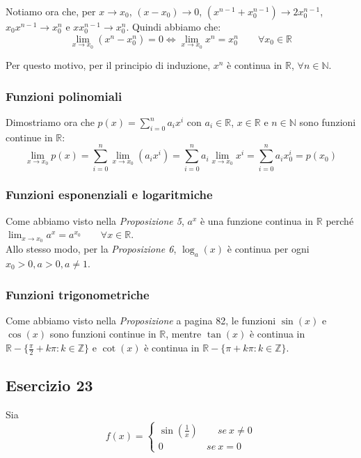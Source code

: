 \documentclass{article}
\begin{document}
\noindent Notiamo ora che, per $x \to x_0$, $(x - x_0) \to 0$, $(x^{n - 1} + x_0^{n - 1}) \to 2x_0^{n - 1}$, $x_0x^{n - 1} \to x_0^n$ e $xx_0^{n - 1} \to x_0^n$. Quindi abbiamo che: 
\begin{equation*}
    \lim_{x \to x_0} (x^n - x_0^n) = 0 \iff \lim_{x \to x_0} x^n = x^n_0 \qquad \forall x_0 \in \mathbb{R}
\end{equation*}

\noindent Per questo motivo, per il principio di induzione, $x^n$ è continua in $\mathbb{R}$, $\forall n \in \mathbb{N}$.

\subsubsection{Funzioni polinomiali}
Dimostriamo ora che $p(x) = \sum_{i = 0}^n a_i x^i$ con $a_i \in \mathbb{R}$, $x \in \mathbb{R}$ e $n \in \mathbb{N}$ sono funzioni continue in $\mathbb{R}$:
\begin{equation*}
    \lim_{x \to x_0} p(x) = \sum_{i = 0}^n \lim_{x \to x_0} (a_i x^i) = \sum_{i = 0}^n a_i \lim_{x \to x_0} x^i = \sum_{i = 0}^n a_i x_0^i = p(x_0)
\end{equation*}

\subsubsection{Funzioni esponenziali e logaritmiche}
Come abbiamo visto nella \textit{Proposizione 5}, $a^x$ è una funzione continua in $\mathbb{R}$ perché $\lim_{x \to x_0} a^x = a^{x_0} \qquad \forall x \in \mathbb{R}$. \\
Allo stesso modo, per la \textit{Proposizione 6}, $\log_a(x)$ è continua per ogni $x_0 > 0, a > 0, a \neq 1$.

\subsubsection{Funzioni trigonometriche}
Come abbiamo visto nella \textit{Proposizione} a pagina 82, le funzioni $\sin(x)$ e $\cos(x)$ sono funzioni continue in $\mathbb{R}$, mentre $\tan(x)$ è continua in $\mathbb{R} - \{\frac{\pi}{2} + k\pi : k \in \mathbb{Z}\}$ e $\cot(x)$ è continua in $\mathbb{R} - \{\pi + k\pi : k \in \mathbb{Z}\}$.

\subsection{Esercizio 23}
Sia
\begin{equation*}
    f(x) = \begin{cases}
        \sin\left(\frac{1}{x}\right) \qquad se \ x \neq 0\\
        0 \qquad \qquad \ \ se \ x = 0
    \end{cases}
\end{equation*}
\end{document}
